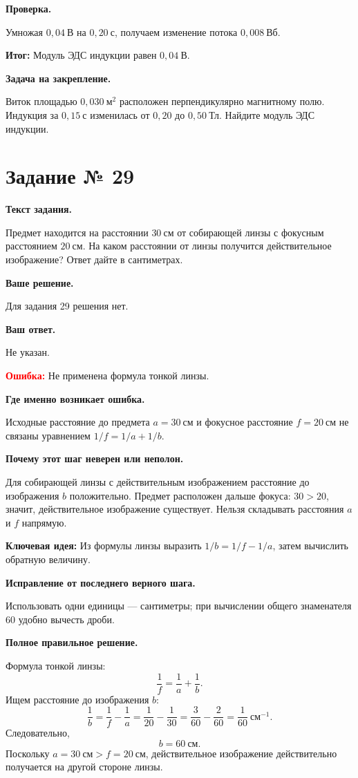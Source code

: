\documentclass[11pt,a4paper]{article}
\newcommand{\reviewblock}[2]{\par\medskip\noindent\textbf{#1}\par\noindent#2\par}
\newcommand{\errorblock}[1]{\par\medskip\noindent\textcolor{red}{\textbf{Ошибка:}} #1\par}
\newcommand{\ideablock}[1]{\par\medskip\noindent\textcolor{blue!60!black}{\textbf{Ключевая идея:}} #1\par}
\newcommand{\resultblock}[1]{\par\medskip\noindent\textcolor{teal!60!black}{\textbf{Итог:}} #1\par}
\begin{document}
\reviewblock{Проверка.}{Умножая $0{,}04\ \text{В}$ на $0{,}20\ \text{с}$, получаем изменение потока $0{,}008\ \text{Вб}$.}

\resultblock{Модуль ЭДС индукции равен $0{,}04\ \text{В}$.}

\reviewblock{Задача на закрепление.}{Виток площадью $0{,}030\ \text{м}^2$ расположен перпендикулярно магнитному полю. Индукция за $0{,}15\ \text{с}$ изменилась от $0{,}20$ до $0{,}50\ \text{Тл}$. Найдите модуль ЭДС индукции.}
\newpage
{}\label{task:29}

\section*{Задание № 29}

\reviewblock{Текст задания.}{Предмет находится на расстоянии $30\ \text{см}$ от собирающей линзы с фокусным расстоянием $20\ \text{см}$. На каком расстоянии от линзы получится действительное изображение? Ответ дайте в сантиметрах.}

\reviewblock{Ваше решение.}{Для задания 29 решения нет.}

\reviewblock{Ваш ответ.}{Не указан.}

\errorblock{Не применена формула тонкой линзы.}

\reviewblock{Где именно возникает ошибка.}{Исходные расстояние до предмета $a=30\ \text{см}$ и фокусное расстояние $f=20\ \text{см}$ не связаны уравнением $1/f=1/a+1/b$.}

\reviewblock{Почему этот шаг неверен или неполон.}{Для собирающей линзы с действительным изображением расстояние до изображения $b$ положительно. Предмет расположен дальше фокуса: $30>20$, значит, действительное изображение существует. Нельзя складывать расстояния $a$ и $f$ напрямую.}

\ideablock{Из формулы линзы выразить $1/b=1/f-1/a$, затем вычислить обратную величину.}

\reviewblock{Исправление от последнего верного шага.}{Использовать одни единицы --- сантиметры; при вычислении общего знаменателя $60$ удобно вычесть дроби.}

\reviewblock{Полное правильное решение.}{Формула тонкой линзы:
\[\frac1f=\frac1a+\frac1b.\]
Ищем расстояние до изображения $b$:
\[\frac1b=\frac1f-\frac1a=\frac1{20}-\frac1{30}=\frac3{60}-\frac2{60}=\frac1{60}\ \text{см}^{-1}.\]
Следовательно,
\[b=60\ \text{см}.\]
Поскольку $a=30\ \text{см}>f=20\ \text{см}$, действительное изображение действительно получается на другой стороне линзы.}
\end{document}
